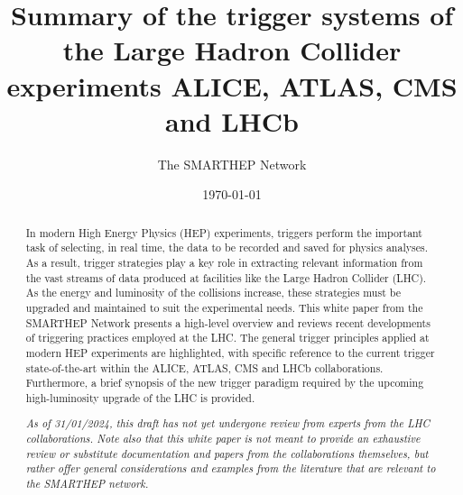 \documentclass{smarthepnote}
\title{Summary of the trigger systems of the Large Hadron Collider experiments ALICE, ATLAS, CMS and LHCb}
\author{The SMARTHEP Network}
\date{\today}
\begin{document}
\maketitle

\begin{abstract}

In modern High Energy Physics (HEP) experiments, triggers perform the important task of selecting, in real time, the data to be recorded and saved for physics analyses. As a result, trigger strategies play a key role in extracting relevant information from the vast streams of data produced at facilities like the Large Hadron Collider (LHC). As the energy and luminosity of the collisions increase, these strategies must be upgraded and maintained to suit the experimental needs. This white paper from the SMARTHEP Network presents a high-level overview and reviews recent developments of triggering practices employed at the LHC. The general trigger principles applied at modern HEP experiments are highlighted, with specific reference to the current trigger state-of-the-art within the ALICE, ATLAS, CMS and LHCb collaborations. Furthermore, a brief synopsis of the new trigger paradigm required by the upcoming high-luminosity upgrade of the LHC is provided. 

\textit{As of 31/01/2024, this draft has not yet undergone review from experts from the LHC collaborations. Note also that this white paper is not meant to provide an exhaustive review or substitute documentation and papers from the collaborations themselves, but rather offer general considerations and examples from the literature that are relevant to the SMARTHEP  network.} 



\end{abstract}
\end{document}
